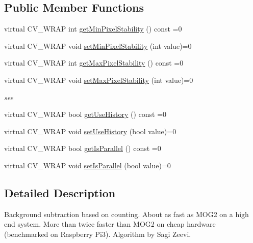 \subsection*{Public Member Functions}
\begin{DoxyCompactItemize}
\item 
virtual C\+V\+\_\+\+W\+R\+AP int \hyperlink{classcv_1_1bgsubcnt_1_1BackgroundSubtractorCNT_ae989dd01f33c289a21b995ee9c69c600}{get\+Min\+Pixel\+Stability} () const =0
\item 
virtual C\+V\+\_\+\+W\+R\+AP void \hyperlink{classcv_1_1bgsubcnt_1_1BackgroundSubtractorCNT_a7fe9be675d4c1995123a60d56db75422}{set\+Min\+Pixel\+Stability} (int value)=0
\item 
virtual C\+V\+\_\+\+W\+R\+AP int \hyperlink{classcv_1_1bgsubcnt_1_1BackgroundSubtractorCNT_ac45a2faa6b753624cbbff9d341cdd3db}{get\+Max\+Pixel\+Stability} () const =0
\item 
virtual C\+V\+\_\+\+W\+R\+AP void \hyperlink{classcv_1_1bgsubcnt_1_1BackgroundSubtractorCNT_a3414551506bf27dda254dd245bfa8e03}{set\+Max\+Pixel\+Stability} (int value)=0
\begin{DoxyCompactList}\small\item\em see \end{DoxyCompactList}\item 
virtual C\+V\+\_\+\+W\+R\+AP bool \hyperlink{classcv_1_1bgsubcnt_1_1BackgroundSubtractorCNT_a86315a974023e507fdc7a40bba177399}{get\+Use\+History} () const =0
\item 
virtual C\+V\+\_\+\+W\+R\+AP void \hyperlink{classcv_1_1bgsubcnt_1_1BackgroundSubtractorCNT_ab2da57637e04beecbe8d812e00a54c52}{set\+Use\+History} (bool value)=0
\item 
virtual C\+V\+\_\+\+W\+R\+AP bool \hyperlink{classcv_1_1bgsubcnt_1_1BackgroundSubtractorCNT_a2e31e009b3901e4a1e43edf7e87cba51}{get\+Is\+Parallel} () const =0
\item 
virtual C\+V\+\_\+\+W\+R\+AP void \hyperlink{classcv_1_1bgsubcnt_1_1BackgroundSubtractorCNT_ab7d88f5d064b3c5cb0a18e80bd0bc265}{set\+Is\+Parallel} (bool value)=0
\end{DoxyCompactItemize}


\subsection{Detailed Description}
Background subtraction based on counting. About as fast as M\+O\+G2 on a high end system. More than twice faster than M\+O\+G2 on cheap hardware (benchmarked on Raspberry Pi3). Algorithm by Sagi Zeevi. 

